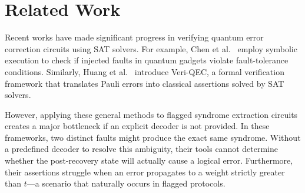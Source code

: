 \documentclass[acmsmall,screen,review,anonymous,nonacm]{acmart}
\begin{document}





\section{Related Work}

Recent works have made significant progress in verifying quantum error correction circuits using SAT solvers. For example, Chen et al.~\cite{chen2025verifying} employ symbolic execution to check if injected faults in quantum gadgets violate fault-tolerance conditions. Similarly, Huang et al.~\cite{10.1145/3729293} introduce Veri-QEC, a formal verification framework that translates Pauli errors into classical assertions solved by SAT solvers. 

However, applying these general methods to flagged syndrome extraction circuits creates a major bottleneck if an explicit decoder is not provided. In these frameworks, two distinct faults might produce the exact same syndrome. Without a predefined decoder to resolve this ambiguity, their tools cannot determine whether the post-recovery state will actually cause a logical error. Furthermore, their assertions struggle when an error propagates to a weight strictly greater than $t$---a scenario that naturally occurs in flagged protocols.
\end{document}
